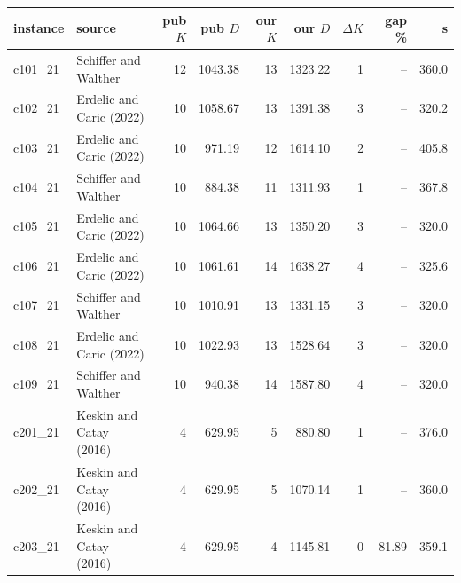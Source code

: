 \begin{tabular}{llrrrrrrr}
\toprule
instance & source & pub $K$ & pub $D$ & our $K$ & our $D$ & $\Delta K$ & gap \% & s \\
\midrule
c101_21 & Schiffer and Walther & 12 & 1043.38 & 13 & 1323.22 & 1 & -- & 360.0 \\
c102_21 & Erdelic and Caric (2022) & 10 & 1058.67 & 13 & 1391.38 & 3 & -- & 320.2 \\
c103_21 & Erdelic and Caric (2022) & 10 & 971.19 & 12 & 1614.10 & 2 & -- & 405.8 \\
c104_21 & Schiffer and Walther & 10 & 884.38 & 11 & 1311.93 & 1 & -- & 367.8 \\
c105_21 & Erdelic and Caric (2022) & 10 & 1064.66 & 13 & 1350.20 & 3 & -- & 320.0 \\
c106_21 & Erdelic and Caric (2022) & 10 & 1061.61 & 14 & 1638.27 & 4 & -- & 325.6 \\
c107_21 & Schiffer and Walther & 10 & 1010.91 & 13 & 1331.15 & 3 & -- & 320.0 \\
c108_21 & Erdelic and Caric (2022) & 10 & 1022.93 & 13 & 1528.64 & 3 & -- & 320.0 \\
c109_21 & Schiffer and Walther & 10 & 940.38 & 14 & 1587.80 & 4 & -- & 320.0 \\
c201_21 & Keskin and Catay (2016) & 4 & 629.95 & 5 & 880.80 & 1 & -- & 376.0 \\
c202_21 & Keskin and Catay (2016) & 4 & 629.95 & 5 & 1070.14 & 1 & -- & 360.0 \\
c203_21 & Keskin and Catay (2016) & 4 & 629.95 & 4 & 1145.81 & 0 & 81.89 & 359.1 \\
\bottomrule
\end{tabular}
